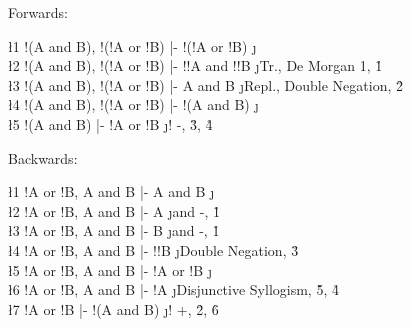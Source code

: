 \documentclass[class=cs245,leqno]{agony}
\begin{document}
\begin{theorem}[De Morgan 2]
\end{theorem}
\begin{prf}
  Forwards:
  \begin{deduce}
    \l1 !(A and B), !(!A or !B) |- !(!A or !B) \j {\E}                          \\
    \l2 !(A and B), !(!A or !B) |- !!A and !!B \j {Tr., De Morgan 1, \r1}       \\
    \l3 !(A and B), !(!A or !B) |- A and B     \j {Repl., Double Negation, \r2} \\
    \l4 !(A and B), !(!A or !B) |- !(A and B)  \j {\E}                          \\
    \l5 !(A and B)              |- !A or !B    \j {! -, \r3, \r4}
  \end{deduce}
  Backwards:
  \begin{deduce}
    \l1 !A or !B, A and B |- A and B    \j {\E}                              \\
    \l2 !A or !B, A and B |- A          \j {and -, \r1}                      \\
    \l3 !A or !B, A and B |- B          \j {and -, \r1}                      \\
    \l4 !A or !B, A and B |- !!B        \j {Double Negation, \r3}            \\
    \l5 !A or !B, A and B |- !A or !B   \j {\E}                              \\
    \l6 !A or !B, A and B |- !A         \j {Disjunctive Syllogism, \r5, \r4} \\
    \l7 !A or !B          |- !(A and B) \j {! +, \r2, \r6}
  \end{deduce}
\end{prf}
\end{document}
